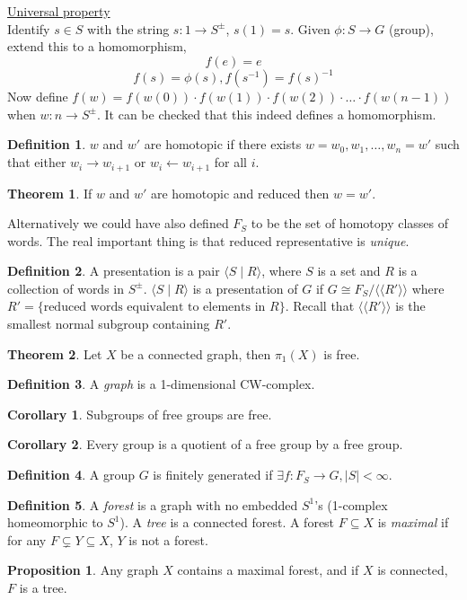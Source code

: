 \documentclass[a4paper,14pt]{extarticle}
\theoremstyle{definition}
\newtheorem*{theorem}{Theorem}
\newtheorem*{definition}{Definition}
\newtheorem*{corollary}{Corollary}
\newtheorem*{proposition}{Proposition}
\begin{document}
\noindent\underline{Universal property} \\ 
Identify $s\in S$ with the string $s:1\rightarrow S^\pm$, $s(1)=s$. Given 
$\phi:S\rightarrow G$ (group), extend this to a homomorphism,
\[f(e)=e\]\[f(s)=\phi(s), f(s^{-1})=f(s)^{-1}\] Now define $f(w)=f(w(0))\cdot f(w(1))\cdot
f(w(2))\cdot\ldots\cdot f(w(n-1))$ when $w:n\rightarrow S^\pm$. It can be checked that 
this indeed defines a homomorphism.

\begin{definition}
  $w$ and $w'$ are homotopic if there exists $w=w_0,w_1,\ldots,w_n=w'$ such that either 
  $w_i\rightarrow w_{i+1}$ or $w_i\leftarrow w_{i+1}$ for all $i$.
\end{definition}

\begin{theorem}
  If $w$ and $w'$ are homotopic and reduced then $w=w'$.
\end{theorem}
Alternatively we could have also defined $F_S$ to be the set of homotopy classes of words.
The real important thing is that reduced representative is \textit{unique}.

\begin{definition}
  A presentation is a pair $\langle S\mid R\rangle$, where $S$ is a set and $R$ is 
  a collection of words in $S^\pm$. $\langle S\mid R\rangle$ is a presentation of $G$ if 
  $G\cong F_S/\langle\langle R'\rangle\rangle$ where $R'=\{\text{reduced words equivalent to elements in $R$}\}$. Recall that $\langle\langle R'\rangle\rangle$ is the smallest 
  normal subgroup containing $R'$.
\end{definition}

\begin{theorem}
  Let $X$ be a connected graph, then $\pi_1(X)$ is free.
\end{theorem}

\begin{definition}
  A \textit{graph} is a 1-dimensional CW-complex.
\end{definition}

\begin{corollary}
  Subgroups of free groups are free.
\end{corollary}

\begin{corollary}
  Every group is a quotient of a free group by a free group.
\end{corollary}

\begin{definition}
  A group $G$ is finitely generated if $\exists f:F_S\rightarrow G, |S|<\infty$.
\end{definition}

\begin{definition}
  A \textit{forest} is a graph with no embedded $S^1$'s (1-complex homeomorphic to $S^1$).
  A \textit{tree} is a connected forest. A forest $F\subseteq X$ is \textit{maximal} if for any 
  $F\subsetneq Y\subseteq X$, $Y$ is not a forest.
\end{definition}

\begin{proposition}
  Any graph $X$ contains a maximal forest, and if $X$ is connected, $F$ is a tree.
\end{proposition}
\end{document}
